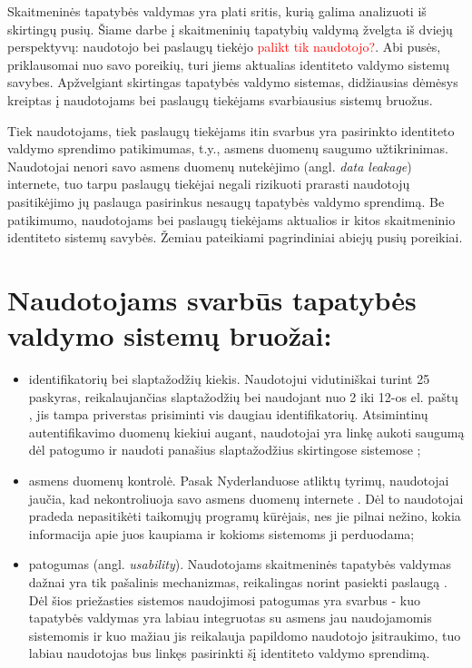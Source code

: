 Skaitmeninės tapatybės valdymas yra plati sritis, kurią galima analizuoti iš skirtingų pusių.
Šiame darbe į skaitmeninių tapatybių valdymą žvelgta iš dviejų perspektyvų: naudotojo bei paslaugų tiekėjo \textcolor{red}{palikt tik naudotojo?}. Abi pusės,
priklausomai nuo savo poreikių, turi jiems aktualias identiteto valdymo sistemų savybes. Apžvelgiant skirtingas tapatybės valdymo sistemas,
didžiausias dėmėsys kreiptas į naudotojams bei paslaugų tiekėjams svarbiausius sistemų bruožus.

Tiek naudotojams, tiek paslaugų tiekėjams itin svarbus yra pasirinkto identiteto valdymo sprendimo patikimumas, t.y., asmens duomenų saugumo užtikrinimas.
Naudotojai nenori savo asmens duomenų nutekėjimo (angl. \textit{data leakage}) internete, tuo tarpu paslaugų tiekėjai negali rizikuoti prarasti naudotojų pasitikėjimo
jų paslauga pasirinkus nesaugų tapatybės valdymo sprendimą. Be patikimumo, naudotojams bei paslaugų tiekėjams aktualios ir 
kitos skaitmeninio identiteto sistemų savybės. Žemiau pateikiami pagrindiniai abiejų pusių poreikiai.
\\

\chapter{\textbf{Naudotojams svarbūs tapatybės valdymo sistemų bruožai:}}

\begin{itemize}
    \item identifikatorių bei slaptažodžių kiekis. Naudotojui vidutiniškai turint 25 paskyras, reikalaujančias slaptažodžių \cite{Florencio2007} bei naudojant
    nuo 2 iki 12-os el. paštų \cite{Gross2007}, jis tampa priverstas prisiminti vis daugiau identifikatorių. Atsimintinų autentifikavimo duomenų kiekiui
    augant, naudotojai yra linkę aukoti saugumą dėl patogumo ir naudoti panašius
    slaptažodžius skirtingose sistemose \cite{Pashalidis2003, Samar1999};
    \item asmens duomenų kontrolė. Pasak Nyderlanduose atliktų tyrimų, naudotojai jaučia, kad nekontroliuoja savo asmens duomenų internete \cite{Baars2016}. Dėl to
    naudotojai pradeda nepasitikėti taikomųjų programų kūrėjais, nes jie pilnai nežino, kokia informacija apie juos kaupiama ir kokioms
    sistemoms ji perduodama;
    \item patogumas (angl. \textit{usability}). Naudotojams skaitmeninės tapatybės valdymas dažnai yra tik pašalinis mechanizmas, reikalingas
    norint pasiekti paslaugą \cite{Dhamija2008}. Dėl šios priežasties sistemos naudojimosi patogumas yra svarbus - kuo tapatybės valdymas yra labiau integruotas
    su asmens jau naudojamomis sistemomis ir kuo mažiau jis reikalauja papildomo naudotojo įsitraukimo, tuo labiau naudotojas bus linkęs pasirinkti šį identiteto valdymo sprendimą.
\end{itemize}

